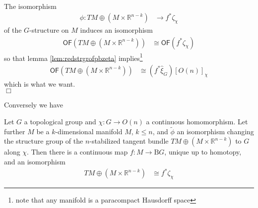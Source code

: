 \begin{prf}
The isomorphism
\begin{align*}
  \phi
  \colon 
  TM
  \oplus
  (M \times \mathbb{R}^{n-k})
  &\to
  f^{\ast}\zeta_{\chi}
\end{align*}
of the $G$-structure on $M$ induces an isomorphism
\begin{align*}
  \mathsf{OF}
  \left(
    TM
    \oplus
    (M \times \mathbb{R}^{n-k})
  \right)
  &\cong
  \mathsf{OF}
  \left(
    f^{\ast}\zeta_{\chi}
  \right)
\end{align*}
so that lemma \ref{lem:redstrgrofpbzeta} implies\footnote{note that any manifold is a paracompact Hausdorff space}
\begin{align*}
  \mathsf{OF}
  \left(
    TM
    \oplus
    (M \times \mathbb{R}^{n-k})
  \right)
  &\cong
  \left(
    f^{\ast}\hat{\xi}_{G}
  \right)
  [O(n)]_{\chi}
\end{align*}
which is what we want.
\\
\phantom{proven}
\hfill
$\Box$
\end{prf}
Conversely we have
\\
\begin{cor}
\label{cor:gstructfromred}
Let $G$ a topological group and $\chi \colon G \to O(n)$ a continuous homomorphism. Let further $M$ be a $k$-dimensional manifold $M$, $k \leq n$, and $\tilde{\phi}$ an isomorphism changing the structure group of the $n$-stabilized tangent bundle $TM \oplus (M \times \mathbb{R}^{n-k})$ to $G$ along $\chi$. Then there is a continuous map $f \colon M \to \mathrm{B}G$, unique up to homotopy, and an isomorphism
\begin{align*}
  TM
  \oplus
  (M \times \mathbb{R}^{n-k})
  &\cong
  f^{\ast}\zeta_{\chi}
\end{align*}
\end{cor}
